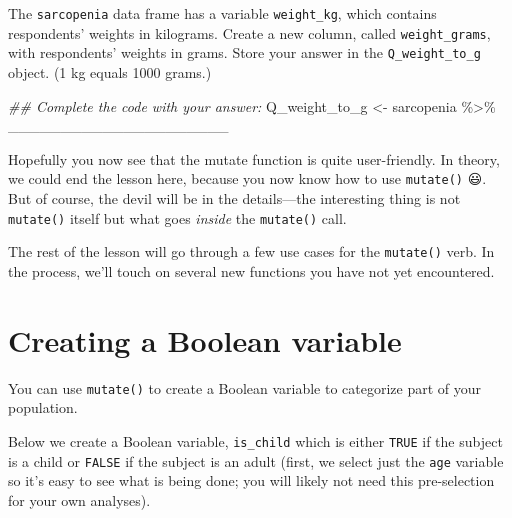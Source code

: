 \documentclass[
  letterpaper,
  DIV=11,
  numbers=noendperiod]{scrreprt}
\newenvironment{Shaded}{\begin{snugshade}}{\end{snugshade}}
\newcommand{\DocumentationTok}[1]{\textcolor[rgb]{0.37,0.37,0.37}{\textit{#1}}}
\newcommand{\NormalTok}[1]{\textcolor[rgb]{0.00,0.23,0.31}{#1}}
\newcommand{\OtherTok}[1]{\textcolor[rgb]{0.00,0.23,0.31}{#1}}
\newcommand{\SpecialCharTok}[1]{\textcolor[rgb]{0.37,0.37,0.37}{#1}}
\begin{document}
\begin{tcolorbox}[enhanced jigsaw, title=\textcolor{quarto-callout-tip-color}{\faLightbulb}\hspace{0.5em}{Practice}, colbacktitle=quarto-callout-tip-color!10!white, leftrule=.75mm, arc=.35mm, opacityback=0, bottomrule=.15mm, rightrule=.15mm, toptitle=1mm, breakable, toprule=.15mm, colback=white, coltitle=black, colframe=quarto-callout-tip-color-frame, bottomtitle=1mm, titlerule=0mm, left=2mm, opacitybacktitle=0.6]

The \texttt{sarcopenia} data frame has a variable \texttt{weight\_kg},
which contains respondents' weights in kilograms. Create a new column,
called \texttt{weight\_grams}, with respondents' weights in grams. Store
your answer in the \texttt{Q\_weight\_to\_g} object. (1 kg equals 1000
grams.)

\begin{Shaded}
\begin{Highlighting}[]
\DocumentationTok{\#\# Complete the code with your answer:}
\NormalTok{Q\_weight\_to\_g }\OtherTok{\textless{}{-}} 
\NormalTok{  sarcopenia }\SpecialCharTok{\%\textgreater{}\%} 
\NormalTok{  \_\_\_\_\_\_\_\_\_\_\_\_\_\_\_\_\_\_\_\_\_}
\end{Highlighting}
\end{Shaded}

\end{tcolorbox}

Hopefully you now see that the mutate function is quite user-friendly.
In theory, we could end the lesson here, because you now know how to use
\texttt{mutate()} 😃. But of course, the devil will be in the
details---the interesting thing is not \texttt{mutate()} itself but what
goes \emph{inside} the \texttt{mutate()} call.

The rest of the lesson will go through a few use cases for the
\texttt{mutate()} verb. In the process, we'll touch on several new
functions you have not yet encountered.

\section{Creating a Boolean variable}\label{creating-a-boolean-variable}

You can use \texttt{mutate()} to create a Boolean variable to categorize
part of your population.

Below we create a Boolean variable, \texttt{is\_child} which is either
\texttt{TRUE} if the subject is a child or \texttt{FALSE} if the subject
is an adult (first, we select just the \texttt{age} variable so it's
easy to see what is being done; you will likely not need this
pre-selection for your own analyses).
\end{document}
